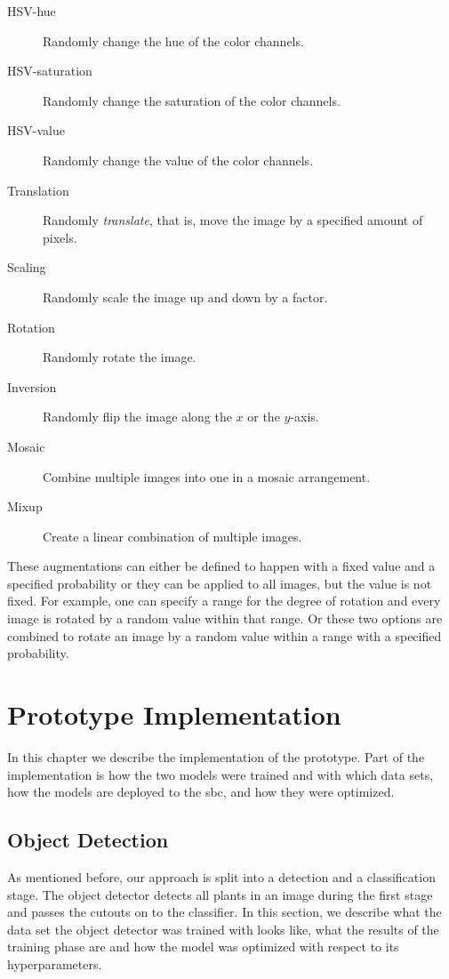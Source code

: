 \documentclass[draft,final]{vutinfth} %
\begin{document}
\begin{description}
\item[HSV-hue] Randomly change the hue of the color channels.
\item[HSV-saturation] Randomly change the saturation of the color
  channels.
\item[HSV-value] Randomly change the value of the color channels.
\item[Translation] Randomly \emph{translate}, that is, move the image
  by a specified amount of pixels.
\item[Scaling] Randomly scale the image up and down by a factor.
\item[Rotation] Randomly rotate the image.
\item[Inversion] Randomly flip the image along the $x$ or the
  $y$-axis.
\item[Mosaic] Combine multiple images into one in a mosaic
  arrangement.
\item[Mixup] Create a linear combination of multiple images.
\end{description}

These augmentations can either be defined to happen with a fixed value
and a specified probability or they can be applied to all images, but
the value is not fixed. For example, one can specify a range for the
degree of rotation and every image is rotated by a random value within
that range. Or these two options are combined to rotate an image by a
random value within a range with a specified probability.

\chapter{Prototype Implementation}
\label{chap:implementation}

In this chapter we describe the implementation of the prototype. Part
of the implementation is how the two models were trained and with
which data sets, how the models are deployed to the \gls{sbc}, and how
they were optimized.

\section{Object Detection}
\label{sec:development-detection}

As mentioned before, our approach is split into a detection and a
classification stage. The object detector detects all plants in an
image during the first stage and passes the cutouts on to the
classifier. In this section, we describe what the data set the object
detector was trained with looks like, what the results of the training
phase are and how the model was optimized with respect to its
hyperparameters.
\end{document}
